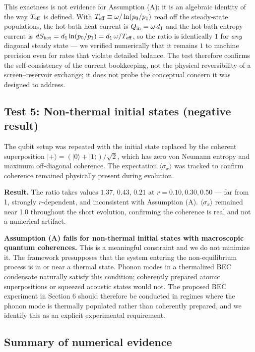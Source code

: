 \documentclass[11pt]{article}
\begin{document}
This exactness is not evidence for Assumption (A): it is an algebraic identity of the way \(T_{\rm eff}\) is defined. With \(T_{\rm eff} \equiv \omega/\ln(p_0/p_1)\) read off the steady-state populations, the hot-bath heat current is \(Q_{\rm in} = \omega\,d_1\) and the hot-bath entropy current is \(dS_{\rm hot} = d_1\ln(p_0/p_1) = d_1\,\omega/T_{\rm eff}\), so the ratio is identically \(1\) for \emph{any} diagonal steady state --- we verified numerically that it remains \(1\) to machine precision even for rates that violate detailed balance. The test therefore confirms the self-consistency of the current bookkeeping, not the physical reversibility of a screen--reservoir exchange; it does not probe the conceptual concern it was designed to address.

\subsection{Test 5: Non-thermal initial states (negative result)}\label{test-5-non-thermal-initial-states-negative-result}

The qubit setup was repeated with the initial state replaced by the coherent superposition \(|+\rangle = (|0\rangle + |1\rangle)/\sqrt{2}\), which has zero von Neumann entropy and maximum off-diagonal coherence. The expectation \(\langle\sigma_x\rangle\) was tracked to confirm coherence remained physically present during evolution.

\textbf{Result.} The ratio takes values \(1.37\), \(0.43\), \(0.21\) at \(r = 0.10, 0.30, 0.50\) --- far from 1, strongly \(r\)-dependent, and inconsistent with Assumption (A). \(\langle\sigma_x\rangle\) remained near 1.0 throughout the short evolution, confirming the coherence is real and not a numerical artifact.

\textbf{Assumption (A) fails for non-thermal initial states with macroscopic quantum coherences.} This is a meaningful constraint and we do not minimize it. The framework presupposes that the system entering the non-equilibrium process is in or near a thermal state. Phonon modes in a thermalized BEC condensate naturally satisfy this condition; coherently prepared atomic superpositions or squeezed acoustic states would not. The proposed BEC experiment in Section 6 should therefore be conducted in regimes where the phonon mode is thermally populated rather than coherently prepared, and we identify this as an explicit experimental requirement.

\subsection{Summary of numerical evidence}\label{summary-of-numerical-evidence}
\end{document}
